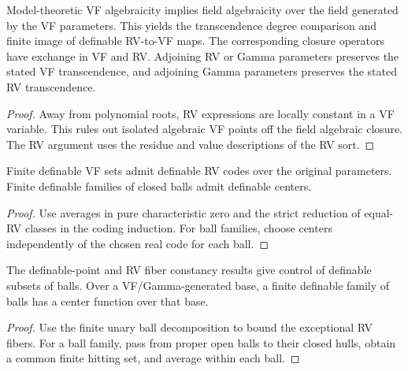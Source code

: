 \begin{lemma}
\label{lem:field-algebraicity}
\leanok
Model-theoretic VF algebraicity implies field algebraicity over the
field generated by the VF parameters. This yields the transcendence
degree comparison and finite image of definable RV-to-VF maps. The
corresponding closure operators have exchange in VF and RV. Adjoining
RV or Gamma parameters preserves the stated VF transcendence, and
adjoining Gamma parameters preserves the stated RV transcendence.
\end{lemma}
\begin{proof}
\leanok
{}
Away from polynomial roots, RV expressions are locally constant in a
VF variable. This rules out isolated algebraic VF points off the field
algebraic closure. The RV argument uses the residue and value
descriptions of the RV sort.
\end{proof}

\begin{lemma}
\label{lem:finite-coding}
\leanok
Finite definable VF sets admit definable RV codes over the original
parameters. Finite definable families of closed balls admit definable
centers.
\end{lemma}
\begin{proof}
\leanok
Use averages in pure characteristic zero and the strict reduction of
equal-RV classes in the coding induction. For ball families, choose
centers independently of the chosen real code for each ball.
\end{proof}

\begin{lemma}
\label{lem:ball-centers}
\leanok
The definable-point and RV fiber constancy results give control of
definable subsets of balls. Over a VF/Gamma-generated base, a finite
definable family of balls has a center function over that base.
\end{lemma}
\begin{proof}
\leanok
{}
Use the finite unary ball decomposition to bound the exceptional RV
fibers. For a ball family, pass from proper open balls to their closed
hulls, obtain a common finite hitting set, and average within each
ball.
\end{proof}

